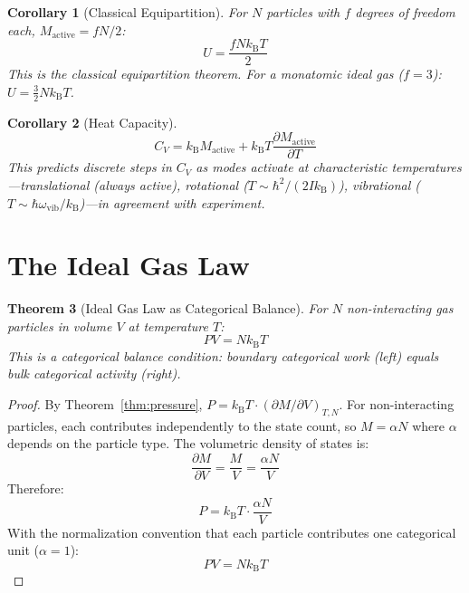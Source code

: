 \documentclass[twocolumn,10pt,a4paper]{article}
\theoremstyle{plain}
\newtheorem{theorem}{Theorem}[section]
\newtheorem{corollary}[theorem]{Corollary}
\theoremstyle{definition}
\theoremstyle{remark}
\newcommand{\kB}{k_{\mathrm{B}}}
\begin{document}
\begin{corollary}[Classical Equipartition]
For $N$ particles with $f$ degrees of freedom each, $M_{\mathrm{active}} = fN/2$:
\begin{equation}
    U = \frac{f N \kB T}{2}
\end{equation}
This is the classical equipartition theorem. For a monatomic ideal gas ($f = 3$): $U = \tfrac{3}{2}N\kB T$.
\end{corollary}

\begin{corollary}[Heat Capacity]
\begin{equation}
    C_V = \kB M_{\mathrm{active}} + \kB T \frac{\partial M_{\mathrm{active}}}{\partial T}
\end{equation}
This predicts discrete steps in $C_V$ as modes activate at characteristic temperatures---translational (always active), rotational ($T \sim \hbar^2/(2I\kB)$), vibrational ($T \sim \hbar\omega_{\mathrm{vib}}/\kB$)---in agreement with experiment.
\end{corollary}

\section{The Ideal Gas Law}
\label{sec:ideal_gas}

\begin{theorem}[Ideal Gas Law as Categorical Balance]
\label{thm:ideal_gas}
For $N$ non-interacting gas particles in volume $V$ at temperature $T$:
\begin{equation}
\boxed{PV = N\kB T}
\end{equation}
This is a categorical balance condition: boundary categorical work (left) equals bulk categorical activity (right).
\end{theorem}

\begin{proof}
By Theorem~\ref{thm:pressure}, $P = \kB T \cdot (\partial M/\partial V)_{T,N}$. For non-interacting particles, each contributes independently to the state count, so $M = \alpha N$ where $\alpha$ depends on the particle type. The volumetric density of states is:
\begin{equation}
    \frac{\partial M}{\partial V} = \frac{M}{V} = \frac{\alpha N}{V}
\end{equation}
Therefore:
\begin{equation}
    P = \kB T \cdot \frac{\alpha N}{V}
\end{equation}
With the normalization convention that each particle contributes one categorical unit ($\alpha = 1$):
\begin{equation}
    PV = N\kB T
\end{equation}
\end{proof}
\end{document}
